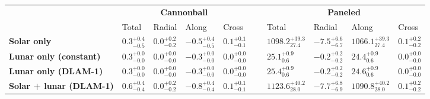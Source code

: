 \begin{tabular}{llllllllll}
\toprule
 & \multicolumn{4}{c}{\bfseries Cannonball} & \bfseries  & \multicolumn{4}{c}{\bfseries Paneled} \\
 & Total & Radial & Along & Cross &  & Total & Radial & Along & Cross \\
\cmidrule{2-5}\cmidrule{7-10}
\bfseries Solar only & $0.3_{-0.5}^{+0.4}$ & $0.0_{-0.2}^{+0.2}$ & $-0.5_{-0.5}^{+0.4}$ & $0.1_{-0.1}^{+0.1}$ & ~ & $1098.2_{27.4}^{+39.3}$ & $-7.5_{-6.7}^{+6.6}$ & $1066.1_{27.4}^{+39.3}$ & $0.1_{-0.2}^{+0.2}$ \\
\bfseries Lunar only (constant) & $0.3_{-0.0}^{+0.0}$ & $0.0_{-0.0}^{+0.0}$ & $-0.3_{-0.0}^{+0.0}$ & $0.0_{-0.0}^{+0.0}$ & ~ & $25.1_{0.6}^{+0.9}$ & $-0.2_{-0.2}^{+0.2}$ & $24.4_{0.6}^{+0.9}$ & $0.0_{-0.0}^{+0.0}$ \\
\bfseries Lunar only (DLAM-1) & $0.3_{-0.0}^{+0.0}$ & $0.0_{-0.0}^{+0.0}$ & $-0.3_{-0.0}^{+0.0}$ & $0.0_{-0.0}^{+0.0}$ & ~ & $25.4_{0.6}^{+0.9}$ & $-0.2_{-0.2}^{+0.2}$ & $24.6_{0.6}^{+0.9}$ & $0.0_{-0.0}^{+0.0}$ \\
\bfseries Solar + lunar (DLAM-1) & $0.6_{-0.4}^{+0.4}$ & $0.0_{-0.2}^{+0.2}$ & $-0.8_{-0.4}^{+0.4}$ & $0.1_{-0.1}^{+0.1}$ & ~ & $1123.6_{28.0}^{+40.2}$ & $-7.7_{-6.9}^{+6.8}$ & $1090.8_{28.0}^{+40.2}$ & $0.1_{-0.2}^{+0.2}$ \\
\bottomrule
\end{tabular}
